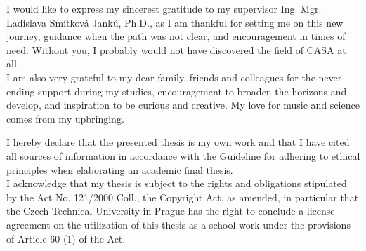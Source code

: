 \documentclass[english,bachelor,unicode]{ctufit-thesis}
\theoremstyle{plain}
\theoremstyle{definition}
\theoremstyle{remark}
\numberwithin{theorem}{chapter}
\begin{document}
 
	\frontmatter\frontmatterinit
	
	
	
	\thispagestyle{empty}\cleardoublepage\maketitle
	
	\imprintpage
	
	\tableofcontents

	\listoffigures
	
	\begin{acknowledgmentpage}
		I would like to express my sincerest gratitude to my supervisor Ing. Mgr. Ladislava Smítková Janků, Ph.D., as I am thankful for setting me on this new journey, guidance when the path was not clear, and encouragement in times of need. Without you, I probably would not have discovered the field of CASA at all.\\

		I am also very grateful to my dear family, friends and colleagues for the never-ending support during my studies, encouragement to broaden the horizons and develop, and inspiration to be curious and creative. My love for music and science comes from my upbringing.
	\end{acknowledgmentpage}
	
	\begin{declarationpage}
		I hereby declare that the presented thesis is my own work and that I have cited all sources of information in accordance with the Guideline for adhering to ethical principles when elaborating an academic final thesis.\\
		
		I acknowledge that my thesis is subject to the rights and obligations stipulated by the Act No. 121/2000 Coll., the Copyright Act, as amended, in particular that the Czech Technical University in Prague has the right to conclude a license agreement on the utilization of this thesis as a school work under the provisions of Article 60 (1) of the Act.
	\end{declarationpage}
	
\end{document}
